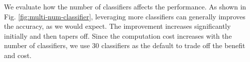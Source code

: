 

 We evaluate how the number of
classifiers affects the performance. As shown in
Fig. \ref{fig:multi-num-classifier}, leveraging more classifiers can generally
improves the accuracy, as we would expect. The improvement increases
significantly initially and then tapers off. Since the computation
cost increases with the number of classifiers, we use 30 classifiers as the default 
to trade off the benefit and cost.

